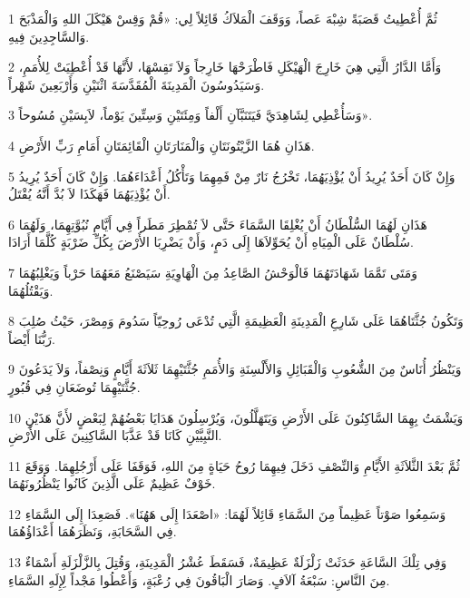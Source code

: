 \par 1 ثُمَّ أُعْطِيتُ قَصَبَةً شِبْهَ عَصاً، وَوَقَفَ الْمَلاَكُ قَائِلاً لِي: «قُمْ وَقِسْ هَيْكَلَ اللهِ وَالْمَذْبَحَ وَالسَّاجِدِينَ فِيهِ.
\par 2 وَأَمَّا الدَّارُ الَّتِي هِيَ خَارِجَ الْهَيْكَلِ فَاطْرَحْهَا خَارِجاً وَلاَ تَقِسْهَا، لأَنَّهَا قَدْ أُعْطِيَتْ لِلأُمَمِ، وَسَيَدُوسُونَ الْمَدِينَةَ الْمُقَدَّسَةَ اثْنَيْنِ وَأَرْبَعِينَ شَهْراً.
\par 3 وَسَأُعْطِي لِشَاهِدَيَّ فَيَتَنَبَّآنِ أَلْفاً وَمِئَتَيْنِ وَسِتِّينَ يَوْماً، لاَبِسَيْنِ مُسُوحاً».
\par 4 هَذَانِ هُمَا الزَّيْتُونَتَانِ وَالْمَنَارَتَانِ الْقَائِمَتَانِ أَمَامِ رَبِّ الأَرْضِ.
\par 5 وَإِنْ كَانَ أَحَدٌ يُرِيدُ أَنْ يُؤْذِيَهُمَا، تَخْرُجُ نَارٌ مِنْ فَمِهِمَا وَتَأْكُلُ أَعْدَاءَهُمَا. وَإِنْ كَانَ أَحَدٌ يُرِيدُ أَنْ يُؤْذِيَهُمَا فَهَكَذَا لاَ بُدَّ أَنَّهُ يُقْتَلُ.
\par 6 هَذَانِ لَهُمَا السُّلْطَانُ أَنْ يُغْلِقَا السَّمَاءَ حَتَّى لاَ تُمْطِرَ مَطَراً فِي أَيَّامِ نُبُوَّتِهِمَا، وَلَهُمَا سُلْطَانٌ عَلَى الْمِيَاهِ أَنْ يُحَوِّلاَهَا إِلَى دَمٍ، وَأَنْ يَضْرِبَا الأَرْضَ بِكُلِّ ضَرْبَةٍ كُلَّمَا أَرَادَا.
\par 7 وَمَتَى تَمَّمَا شَهَادَتَهُمَا فَالْوَحْشُ الصَّاعِدُ مِنَ الْهَاوِيَةِ سَيَصْنَعُ مَعَهُمَا حَرْباً وَيَغْلِبُهُمَا وَيَقْتُلُهُمَا.
\par 8 وَتَكُونُ جُثَّتَاهُمَا عَلَى شَارِعِ الْمَدِينَةِ الْعَظِيمَةِ الَّتِي تُدْعَى رُوحِيّاً سَدُومَ وَمِصْرَ، حَيْثُ صُلِبَ رَبُّنَا أَيْضاً.
\par 9 وَيَنْظُرُ أُنَاسٌ مِنَ الشُّعُوبِ وَالْقَبَائِلِ وَالأَلْسِنَةِ وَالأُمَمِ جُثَّتَيْهِمَا ثَلاَثَةَ أَيَّامٍ وَنِصْفاً، وَلاَ يَدَعُونَ جُثَّتَيْهِمَا تُوضَعَانِ فِي قُبُورٍ.
\par 10 وَيَشْمَتُ بِهِمَا السَّاكِنُونَ عَلَى الأَرْضِ وَيَتَهَلَّلُونَ، وَيُرْسِلُونَ هَدَايَا بَعْضُهُمْ لِبَعْضٍ لأَنَّ هَذَيْنِ النَّبِيَّيْنِ كَانَا قَدْ عَذَّبَا السَّاكِنِينَ عَلَى الأَرْضِ.
\par 11 ثُمَّ بَعْدَ الثَّلاَثَةِ الأَيَّامِ وَالنِّصْفِ دَخَلَ فِيهِمَا رُوحُ حَيَاةٍ مِنَ اللهِ، فَوَقَفَا عَلَى أَرْجُلِهِمَا. وَوَقَعَ خَوْفٌ عَظِيمٌ عَلَى الَّذِينَ كَانُوا يَنْظُرُونَهُمَا.
\par 12 وَسَمِعُوا صَوْتاً عَظِيماً مِنَ السَّمَاءِ قَائِلاً لَهُمَا: «اصْعَدَا إِلَى هَهُنَا». فَصَعِدَا إِلَى السَّمَاءِ فِي السَّحَابَةِ، وَنَظَرَهُمَا أَعْدَاؤُهُمَا.
\par 13 وَفِي تِلْكَ السَّاعَةِ حَدَثَتْ زَلْزَلَةٌ عَظِيمَةٌ، فَسَقَطَ عُشْرُ الْمَدِينَةِ، وَقُتِلَ بِالزَّلْزَلَةِ أَسْمَاءٌ مِنَ النَّاسِ: سَبْعَةُ آلاَفٍ. وَصَارَ الْبَاقُونَ فِي رُعْبَةٍ، وَأَعْطُوا مَجْداً لِإِلَهِ السَّمَاءِ.
